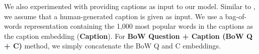 We also experimented with providing captions as input to our model. Similar to , we assume that a human-generated caption is given as input. We use a bag-of-words representation containing the 1,000 most popular words in the captions as the caption embedding (\textbf{Caption}). For \textbf{BoW Question + Caption (BoW Q + C)} method, we simply concatenate the BoW Q and C embeddings. 

